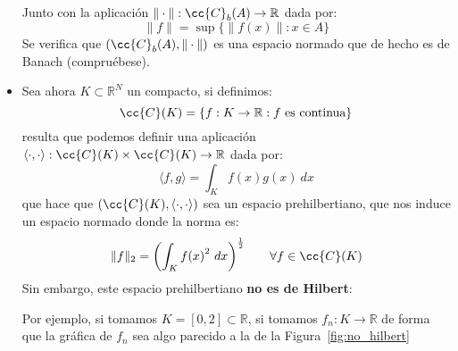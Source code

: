 \begin{itemize}
        Junto con la aplicación $\|\cdot \|:\cc{C}_b(A)\to \mathbb{R}$ dada por:
        \begin{equation*}
            \|f\| = \sup \{\|f(x)\| : x \in A\}
        \end{equation*}
        Se verifica que $(\cc{C}_b(A), \|\cdot \|)$ es una espacio normado que de hecho es de Banach (compruébese). %
    \item Sea ahora $K\subset \mathbb{R}^N$ un compacto, si definimos:
        \begin{equation*}
            \cc{C}(K) = \{f:K\to \mathbb{R}  : f \text{\ es continua}\}
        \end{equation*}
        resulta que podemos definir una aplicación $\langle \cdot ,\cdot  \rangle:\cc{C}(K)\times \cc{C}(K)\to \mathbb{R} $ dada por:
        \begin{equation*}
            \langle f,g \rangle  = \int_K f(x)g(x)~dx
        \end{equation*}
        que hace que $(\cc{C}(K), \langle \cdot ,\cdot  \rangle )$ sea un espacio prehilbertiano, que nos induce un espacio normado donde la norma es:
        \begin{equation*}
            \|f\|_2 = {\left(\int_{K}{f(x)}^{2}~dx \right)}^{\frac{1}{2}} \qquad \forall f\in \cc{C}(K)
        \end{equation*}
        Sin embargo, este espacio prehilbertiano \textbf{no es de Hilbert}:

        Por ejemplo, si tomamos $K = [0,2]\subset \mathbb{R}$, si tomamos $f_n:K\to \mathbb{R}$ de forma que la gráfica de $f_n$ sea algo parecido a la de la Figura~\ref{fig:no_hilbert}

        \begin{figure}[H]
            \centering
\end{figure}
\end{itemize}
